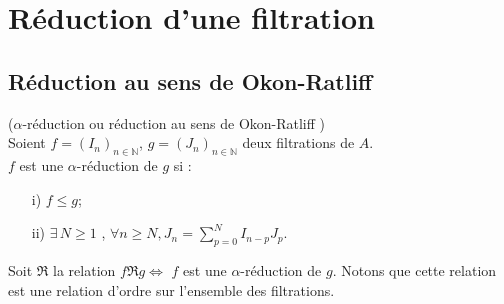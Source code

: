 \section{Réduction d'une filtration}
\subsection{Réduction au sens de Okon-Ratliff}
\begin{madefinition}
	($\alpha$-réduction ou réduction au sens de Okon-Ratliff\cite{Ok} )\\
	Soient $f=(I_n)_{n \in \mathbb{N}}$, $g=(J_n)_{n \in \mathbb{N}}$ deux filtrations de $A$.\\
	$f$ est une $\alpha$-réduction de $g$ si :
	\begin{enumerate}
		\item[i)] $f \leq g$;
		\item[ii)] $\exists \, N \geq 1$ , $\forall n \geq N , J_n = \displaystyle \sum_{p=0}^{N}{I_{n-p} J_p}$.
	\end{enumerate}
\end{madefinition}
\begin{maremarque}
	Soit $\Re$ la relation $f \Re g \Leftrightarrow$ $f$ est une $\alpha$-réduction de $g$. Notons que cette relation est une relation d'ordre sur l'ensemble des filtrations.	
\end{maremarque}
